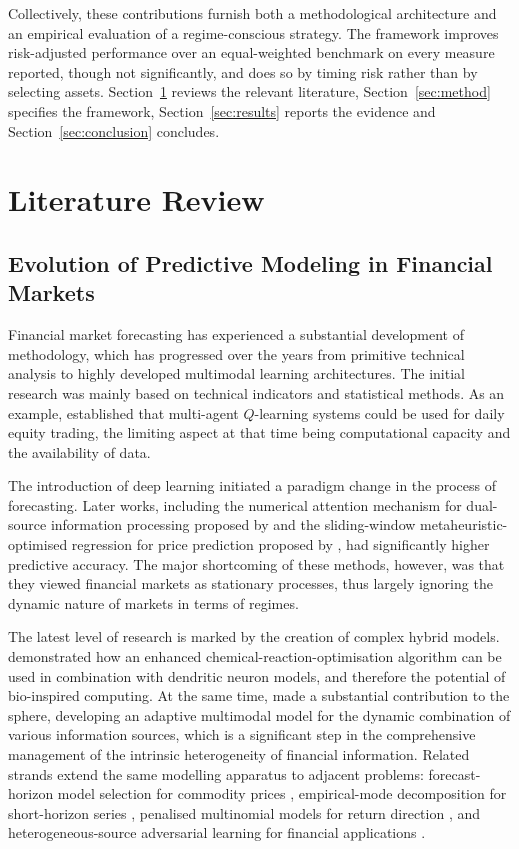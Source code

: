 \documentclass{singlecol-new}
\theoremstyle{TH}{
\newtheorem{lemma}{Lemma}
\newtheorem{theorem}[lemma]{Theorem}
\newtheorem{corrolary}[lemma]{Corrolary}
\newtheorem{conjecture}[lemma]{Conjecture}
\newtheorem{proposition}[lemma]{Proposition}
\newtheorem{claim}[lemma]{Claim}
\newtheorem{stheorem}[lemma]{Wrong Theorem}
\newtheorem{algorithm}{Algorithm}
}
\theoremstyle{THrm}{
\newtheorem{definition}{Definition}[section]
\newtheorem{question}{Question}[section]
\newtheorem{remark}{Remark}
\newtheorem{scheme}{Scheme}
}
\theoremstyle{THhit}{
\newtheorem{case}{Case}[section]
}
\begin{document}
Collectively, these contributions furnish both a methodological architecture and an
empirical evaluation of a regime-conscious strategy. The framework improves risk-adjusted
performance over an equal-weighted benchmark on every measure reported, though not
significantly, and does so by timing risk rather than by selecting assets.
Section~\ref{sec:lit} reviews the relevant literature, Section~\ref{sec:method} specifies
the framework, Section~\ref{sec:results} reports the evidence and
Section~\ref{sec:conclusion} concludes.

\section{Literature Review}
\label{sec:lit}

\subsection{Evolution of Predictive Modeling in Financial Markets}

Financial market forecasting has experienced a substantial development of methodology,
which has progressed over the years from primitive technical analysis to highly developed
multimodal learning architectures. The initial research was mainly based on technical
indicators and statistical methods. As an example, \citet{lee07} established that
multi-agent $Q$-learning systems could be used for daily equity trading, the limiting
aspect at that time being computational capacity and the availability of data.

The introduction of deep learning initiated a paradigm change in the process of
forecasting. Later works, including the numerical attention mechanism for dual-source
information processing proposed by \citet{liu19} and the sliding-window
metaheuristic-optimised regression for price prediction proposed by \citet{chou18}, had
significantly higher predictive accuracy. The major shortcoming of these methods,
however, was that they viewed financial markets as stationary processes, thus largely
ignoring the dynamic nature of markets in terms of regimes.

The latest level of research is marked by the creation of complex hybrid models.
\citet{nayak22} demonstrated how an enhanced chemical-reaction-optimisation algorithm can
be used in combination with dendritic neuron models, and therefore the potential of
bio-inspired computing. At the same time, \citet{farimani24} made a substantial
contribution to the sphere, developing an adaptive multimodal model for the dynamic
combination of various information sources, which is a significant step in the
comprehensive management of the intrinsic heterogeneity of financial information.
Related strands extend the same modelling apparatus to adjacent problems: forecast-horizon
model selection for commodity prices \citep{zhang20}, empirical-mode decomposition for
short-horizon series \citep{yang20}, penalised multinomial models for return direction
\citep{hu24}, and heterogeneous-source adversarial learning for financial applications
\citep{khuwaja23}.
\end{document}

